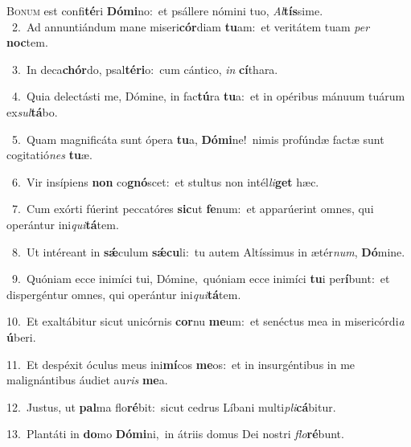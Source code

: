 \lettrine{\initial\textcolor{\initialcolor}{B}}{onum} est confi\-\textbf{té}\-ri \textbf{Dó}\-\textbf{mi}no:~\star et psállere nómini tuo, \textit{Al}\-\textbf{tís}sime.\\
{\numbfont\textcolor{\numbcolor}{~2.}}~Ad annuntiándum mane miseri\-\textbf{cór}\-diam \textbf{tu}\-am:~\star et veritátem tuam \textit{per} \textbf{noc}\-tem.\par
{\numbfont\textcolor{\numbcolor}{~3.}}~In deca\-\textbf{chór}\-do, psal\-\textbf{té}\-\textbf{ri}o:~\star cum cántico, \textit{in} \textbf{cí}\-thara.\par
{\numbfont\textcolor{\numbcolor}{~4.}}~Quia delectásti me, Dómine, in fac\-\textbf{tú}\-ra \textbf{tu}\-a:~\star et in opéribus mánuum tuárum ex\-\textit{sul}\-\textbf{tá}bo.\par
{\numbfont\textcolor{\numbcolor}{~5.}}~Quam magnificáta sunt ópera \textbf{tu}\-a, \textbf{Dó}\-\textbf{mi}ne!~\star nimis profúndæ factæ sunt cogitatió\textit{nes} \textbf{tu}\-æ.\par
{\numbfont\textcolor{\numbcolor}{~6.}}~Vir insípiens \textbf{non} co\-\textbf{gnó}\-scet:~\star et stultus non intél\-\textit{li}\-\textbf{get} hæc.\par
{\numbfont\textcolor{\numbcolor}{~7.}}~Cum exórti fúerint peccatóres \textbf{sic}\-ut \textbf{fe}\-num:~\star et apparúerint omnes, qui operántur ini\-\textit{qui}\-\textbf{tá}tem.\par
{\numbfont\textcolor{\numbcolor}{~8.}}~Ut intéreant in \textbf{sǽ}\-culum \textbf{sǽ}\-\textbf{cu}li:~\star tu autem Altíssimus in ætér\-\textit{num}\-, \textbf{Dó}\-mine.\par
{\numbfont\textcolor{\numbcolor}{~9.}}~Quóniam ecce inimíci tui, Dómine,~\dagger quóniam ecce inimíci \textbf{tu}\-i per\-\textbf{í}\-bunt:~\star et dispergéntur omnes, qui operántur ini\-\textit{qui}\-\textbf{tá}tem.\par
{\numbfont\textcolor{\numbcolor}{10.}}~Et exaltábitur sicut unicórnis \textbf{cor}\-nu \textbf{me}\-um:~\star et senéctus mea in misericórdi\textit{a} \textbf{ú}\-beri.\par
{\numbfont\textcolor{\numbcolor}{11.}}~Et despéxit óculus meus ini\-\textbf{mí}\-cos \textbf{me}\-os:~\star et in insurgéntibus in me malignántibus áudiet au\textit{ris} \textbf{me}\-a.\par
{\numbfont\textcolor{\numbcolor}{12.}}~Justus, ut \textbf{pal}\-ma flo\-\textbf{ré}\-bit:~\star sicut cedrus Líbani multi\-\textit{pli}\-\textbf{cá}bitur.\par
{\numbfont\textcolor{\numbcolor}{13.}}~Plantáti in \textbf{do}\-mo \textbf{Dó}\-\textbf{mi}ni,~\star in átriis domus Dei nostri \textit{flo}\-\textbf{ré}bunt.\par
